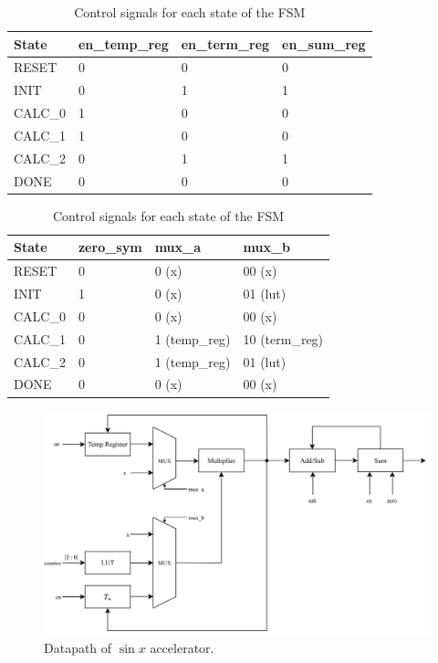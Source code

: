 \documentclass[../main.tex]{subfiles}
\begin{document}
\begin{table}[h]
    \centering
    \caption{Control signals for each state of the FSM}
    \vspace{-10pt}
    \begin{tabularx}{\textwidth}{|l|X|X|X|}
        \hline
        \textbf{State} & \textbf{en\_temp\_reg} & \textbf{en\_term\_reg} & \textbf{en\_sum\_reg} \\
        \hline
        RESET   & 0 & 0 & 0 \\
        INIT    & 0 & 1 & 1 \\
        CALC\_0 & 1 & 0 & 0 \\
        CALC\_1 & 1 & 0 & 0 \\
        CALC\_2 & 0 & 1 & 1 \\
        DONE    & 0 & 0 & 0 \\
        \hline
    \end{tabularx}

    \vspace{1.0em}

    \begin{tabularx}{\textwidth}{|l|X|X|X|}
        \hline
        \textbf{State} & \textbf{zero\_sym} & \textbf{mux\_a} & \textbf{mux\_b} \\
        \hline
        RESET   & 0 & 0 (x)         & 00 (x)            \\
        INIT    & 1 & 0 (x)         & 01 (lut)          \\
        CALC\_0 & 0 & 0 (x)         & 00 (x)            \\
        CALC\_1 & 0 & 1 (temp\_reg) & 10 (term\_reg)    \\
        CALC\_2 & 0 & 1 (temp\_reg) & 01 (lut)          \\
        DONE    & 0 & 0 (x)         & 00 (x)            \\
        \hline
    \end{tabularx}
    \label{tab:fsm_control_signals}
\end{table}

\begin{figure}[H]
    \centering
    \includegraphics[width=\linewidth]{assets/q5_dp.png}
    \caption{Datapath of $\sin x$ accelerator.}
    \label{fig:q5_dp}
\end{figure}
\end{document}

